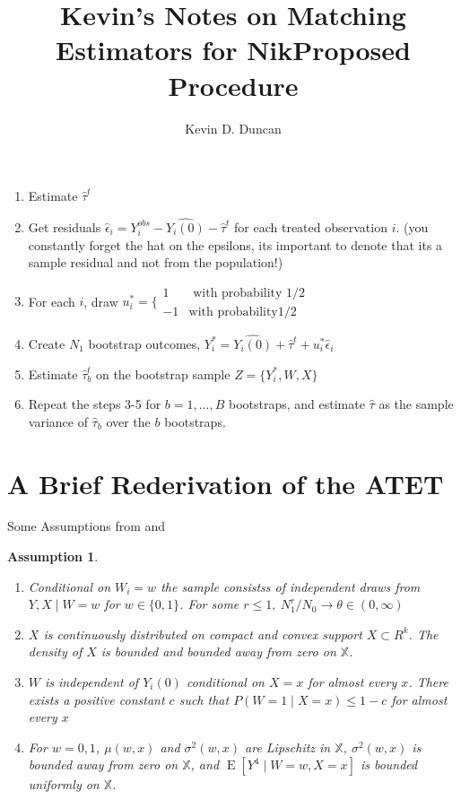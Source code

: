 \documentclass{article}
\newtheorem{assumption}{Assumption}[section]
\DeclareMathOperator{\E}{E}
\newcommand{\hta}{\hat \tau^{t}}
\newcommand{\htb}{\hat \tau_{b}^{t}}
\newcommand{\he}{\hat{\epsilon}_{i}}
\newcommand{\Yi}{Y_{i}^{obs}}
\newcommand{\Yb}{Y_{i}^{*}}
\newcommand{\hYi}{\hat{Y_{i}(0)}}
\newcommand{\us}{u_{i}^{*}}
\begin{document}
\title{Kevin's Notes on Matching Estimators for Nik}
\author{Kevin D. Duncan}
\maketitle

\begin{table}[h!]
\title{Proposed Procedure}
\begin{enumerate}
\item Estimate $\hta$
\item Get residuals $\he = \Yi-\hYi-\hta$ for each treated observation $i$. (you constantly forget the hat on the epsilons, its important to denote that its a sample residual and not from the population!)
\item For each $i$, draw $\us = \bigg\{ \begin{array}{cc} 1 & \text{ with probability } 1/2 \\ -1 & \text{with probability} 1/2 \end{array}$
\item Create $N_{1}$ bootstrap outcomes, $\Yb = \hYi +\hta + \us\he$
\item Estimate $\htb$ on the bootstrap sample $Z = \{\Yb, W, X\}$
\item Repeat the steps 3-5 for $b = 1,...,B$ bootstraps, and estimate $\hat \tau$ as the sample variance of $\hat \tau_{b}$ over the $b$ bootstraps.
\end{enumerate}
\label{boot}
\end{table}

\section{A Brief Rederivation of the ATET}

Some Assumptions from \cite{OnR:16} and \cite{AnI:08}

\begin{assumption}\label{ATETasmp}

\begin{enumerate}
\item Conditional on $W_{i} = w$ the sample consistss of independent draws from $Y,X \mid W = w$ for $w \in \{0,1\}$. For some $r \leq 1,\ N_{1}^{r}/N_{0} \to \theta \in (0,\infty)$
\item $X$ is continuously distributed on compact and convex support $X \subset R^{k}$. The density of $X$ is bounded and bounded away from zero on $\mathbb{X}$.
\item $W$ is independent of $Y_{i}(0)$ conditional on $X = x$ for almost every $x$. There exists a positive constant $c$ such that $P(W = 1 \mid X= x) \leq 1-c$ for almost every $x$
\item For $w = 0,1$, $\mu(w,x)$ and $\sigma^{2}(w,x)$ are Lipschitz in $\mathbb{X}$, $\sigma^{2}(w,x)$ is bounded away from zero on $\mathbb{X}$, and $\E[Y^{4} \mid W=w, X=x]$ is bounded uniformly on $\mathbb{X}$.
\end{enumerate}

\end{assumption}
\end{document}

